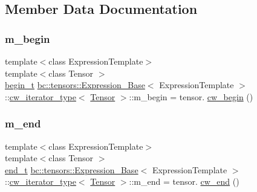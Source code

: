 \subsection{Member Data Documentation}
\mbox{\label{structbc_1_1tensors_1_1Expression__Base_1_1cw__iterator__type_a5043d6948601397e5e0516bf18ffac31}} 
\subsubsection{\texorpdfstring{m\+\_\+begin}{m\_begin}}
{\footnotesize\ttfamily template$<$class Expression\+Template$>$ \\
template$<$class Tensor $>$ \\
\hyperlink{structbc_1_1tensors_1_1Expression__Base_1_1cw__iterator__type_a61e8ad264dbd2dc886a84e03cd45867e}{begin\+\_\+t} \hyperlink{classbc_1_1tensors_1_1Expression__Base}{bc\+::tensors\+::\+Expression\+\_\+\+Base}$<$ Expression\+Template $>$\+::\hyperlink{structbc_1_1tensors_1_1Expression__Base_1_1cw__iterator__type}{cw\+\_\+iterator\+\_\+type}$<$ \hyperlink{namespacebc_a659391e47ab612be3ba6c18cf9c89159}{Tensor} $>$\+::m\+\_\+begin = tensor. \hyperlink{classbc_1_1tensors_1_1Expression__Base_ab7254a15d10156123aec300006eb1c9d}{cw\+\_\+begin} ()}

\mbox{\label{structbc_1_1tensors_1_1Expression__Base_1_1cw__iterator__type_a646e686646c888998069d4b67468f2ef}} 
\subsubsection{\texorpdfstring{m\+\_\+end}{m\_end}}
{\footnotesize\ttfamily template$<$class Expression\+Template$>$ \\
template$<$class Tensor $>$ \\
\hyperlink{structbc_1_1tensors_1_1Expression__Base_1_1cw__iterator__type_aa4dec4d7233266282d8243b49a101174}{end\+\_\+t} \hyperlink{classbc_1_1tensors_1_1Expression__Base}{bc\+::tensors\+::\+Expression\+\_\+\+Base}$<$ Expression\+Template $>$\+::\hyperlink{structbc_1_1tensors_1_1Expression__Base_1_1cw__iterator__type}{cw\+\_\+iterator\+\_\+type}$<$ \hyperlink{namespacebc_a659391e47ab612be3ba6c18cf9c89159}{Tensor} $>$\+::m\+\_\+end = tensor. \hyperlink{classbc_1_1tensors_1_1Expression__Base_a4ca9ee5e831fdfa6575e34071927cc1e}{cw\+\_\+end} ()}

